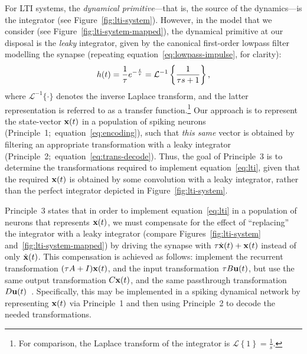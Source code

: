 For LTI systems, the \emph{dynamical primitive}---that is, the source of the dynamics---is the integrator (see Figure~\ref{fig:lti-system}).
However, in the model that we consider (see Figure~\ref{fig:lti-system-mapped}), the dynamical primitive at our disposal is the \emph{leaky} integrator, given by the canonical first-order lowpass filter modelling the synapse (repeating equation~\ref{eq:lowpass-impulse}, for clarity):
\begin{align} \label{eq:lowpass-laplace}
h(t) = \frac{1}{\tau} e^{-\frac{t}{\tau}} = \mathcal{L}^{-1}\left\{{ \frac{1}{\tau s + 1} }\right\} \text{,}
\end{align}
where $\mathcal{L}^{-1}\{ \cdot \}$ denotes the inverse Laplace transform, and the latter representation is referred to as a transfer function.\footnote{
For comparison, the Laplace transform of the integrator is $\mathcal{L}\left\{ 1 \right\} = \frac{1}{s}$.}
Our approach is to represent the state-vector $\mathbf{x}(t)$ in a population of spiking neurons (Principle~1;~equation~\ref{eq:encoding}), such that \emph{this same} vector is obtained by filtering an appropriate transformation with a leaky integrator (Principle~2;~equation~\ref{eq:trans-decode}).
Thus, the goal of Principle~3 is to determine the transformations required to implement equation~\ref{eq:lti}, given that the required $\mathbf{x}(t)$ is obtained by some convolution with a leaky integrator, rather than the perfect integrator depicted in Figure~\ref{fig:lti-system}.

Principle~3 states that in order to implement equation~\ref{eq:lti} in a population of neurons that represents $\mathbf{x}(t)$, we must compensate for the effect of ``replacing'' the integrator with a leaky integrator (compare Figures~\ref{fig:lti-system} and~\ref{fig:lti-system-mapped}) by driving the synapse with $\tau \dot{\mathbf{x}}(t) + \mathbf{x}(t)$ instead of only $\dot{\mathbf{x}}(t)$.
This compensation is achieved as follows: implement the recurrent transformation $(\tau A + I)\mathbf{x}(t)$, and the input transformation $\tau B \mathbf{u}(t)$, but use the same output transformation $C\mathbf{x}(t)$, and the same passthrough transformation $D\mathbf{u}(t)$~\citep[][pp.~221--225]{eliasmith2003a}.
Specifically, this may be implemented in a spiking dynamical network by representing $\mathbf{x}(t)$ via Principle~1 and then using Principle~2 to decode the needed transformations.


